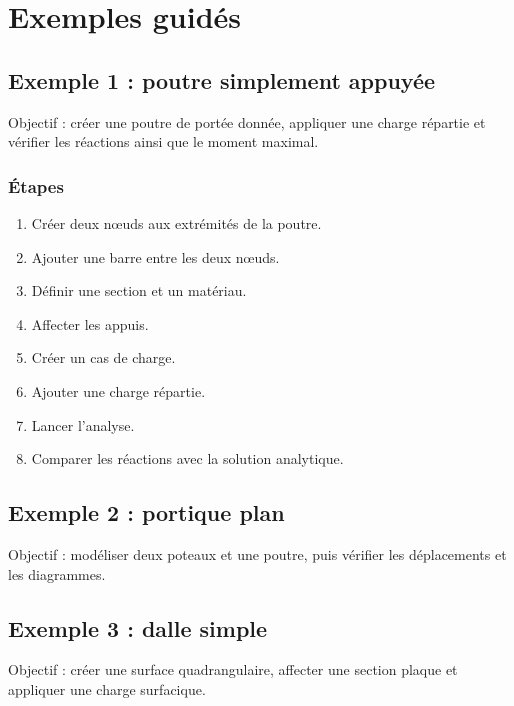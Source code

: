 \chapter{Exemples guidés}

\section{Exemple 1 : poutre simplement appuyée}

Objectif : créer une poutre de portée donnée, appliquer une charge répartie et
vérifier les réactions ainsi que le moment maximal.

\subsection*{Étapes}

\begin{enumerate}
  \item Créer deux nœuds aux extrémités de la poutre.
  \item Ajouter une barre entre les deux nœuds.
  \item Définir une section et un matériau.
  \item Affecter les appuis.
  \item Créer un cas de charge.
  \item Ajouter une charge répartie.
  \item Lancer l'analyse.
  \item Comparer les réactions avec la solution analytique.
\end{enumerate}


\section{Exemple 2 : portique plan}

Objectif : modéliser deux poteaux et une poutre, puis vérifier les déplacements
et les diagrammes.


\section{Exemple 3 : dalle simple}

Objectif : créer une surface quadrangulaire, affecter une section plaque et
appliquer une charge surfacique.

